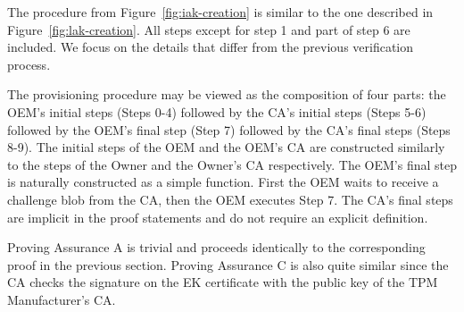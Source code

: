 \documentclass[runningheads]{llncs}
\begin{document}



The procedure from Figure~\ref{fig:iak-creation} is similar to the one
described in Figure~\ref{fig:lak-creation}. All steps except for step 1 and
part of step 6 are included. We focus on the details that differ from
the previous verification process.

The provisioning procedure may be viewed as the composition of four
parts: the OEM's initial steps (Steps 0-4) followed by the CA's
initial steps (Steps 5-6) followed by the OEM's final step (Step 7)
followed by the CA's final steps (Steps 8-9). The initial steps of the
OEM and the OEM's CA are constructed similarly to the steps of the
Owner and the Owner's CA respectively.  The OEM's final step is
naturally constructed as a simple function. First the OEM waits to
receive a challenge blob from the CA, then the OEM executes Step
7. The CA's final steps are implicit in the proof statements and do
not require an explicit definition.

Proving Assurance A is trivial and proceeds identically to the
corresponding proof in the previous section. Proving Assurance C is
also quite similar since the CA checks the signature on the EK
certificate with the public key of the TPM Manufacturer's CA. 
\end{document}

